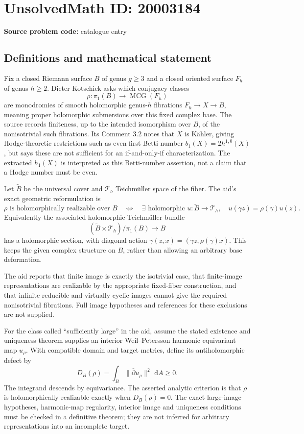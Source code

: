 \documentclass[11pt]{article}
\newcommand{\dd}{\,\mathrm{d}}
\begin{document}
\section*{UnsolvedMath ID: 20003184}
\textbf{Source problem code:} catalogue entry
\subsection{Definitions and mathematical statement}
Fix a closed Riemann surface $B$ of genus $g\geq3$ and a closed oriented surface $F_h$ of genus $h\geq2$. Dieter Kotschick asks which conjugacy classes
\[
\rho:\pi_1(B)\to\operatorname{MCG}(F_h)
\]
are monodromies of smooth holomorphic genus-$h$ fibrations $F_h\to X\to B$, meaning proper holomorphic submersions over this fixed complex base. The source records finiteness, up to the intended isomorphism over $B$, of the nonisotrivial such fibrations. Its Comment 3.2 notes that $X$ is K\"ahler, giving Hodge-theoretic restrictions such as even first Betti number $b_1(X)=2h^{1,0}(X)$, but says these are not sufficient for an if-and-only-if characterization. The extracted $h_1(X)$ is interpreted as this Betti-number assertion, not a claim that a Hodge number must be even.

Let $\widetilde B$ be the universal cover and $\mathcal T_h$ Teichm\"uller space of the fiber. The aid's exact geometric reformulation is
\[
\rho\text{ is holomorphically realizable over }B
\quad\Longleftrightarrow\quad
\exists\text{ holomorphic }u:\widetilde B\to\mathcal T_h,
\quad u(\gamma z)=\rho(\gamma)u(z).
\]
Equivalently the associated holomorphic Teichm\"uller bundle
\[
(\widetilde B\times\mathcal T_h)/\pi_1(B)\longrightarrow B
\]
has a holomorphic section, with diagonal action $\gamma(z,x)=(\gamma z,\rho(\gamma)x)$. This keeps the given complex structure on $B$, rather than allowing an arbitrary base deformation.

The aid reports that finite image is exactly the isotrivial case, that finite-image representations are realizable by the appropriate fixed-fiber construction, and that infinite reducible and virtually cyclic images cannot give the required nonisotrivial fibrations. Full image hypotheses and references for these exclusions are not supplied.

For the class called ``sufficiently large'' in the aid, assume the stated existence and uniqueness theorem supplies an interior Weil--Petersson harmonic equivariant map $u_\rho$. With compatible domain and target metrics, define its antiholomorphic defect by
\[
D_B(\rho)=\int_B\|\overline\partial u_\rho\|^2\,\dd A\geq0.
\]
The integrand descends by equivariance. The asserted analytic criterion is that $\rho$ is holomorphically realizable exactly when $D_B(\rho)=0$. The exact large-image hypotheses, harmonic-map regularity, interior image and uniqueness conditions must be checked in a definitive theorem; they are not inferred for arbitrary representations into an incomplete target.
\end{document}
